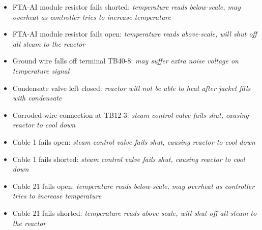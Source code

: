 





\begin{itemize}
\item{} FTA-AI module resistor fails shorted: {\it temperature reads below-scale, may overheat as controller tries to increase temperature}
\item{} FTA-AI module resistor fails open: {\it temperature reads above-scale, will shut off all steam to the reactor}
\item{} Ground wire falls off terminal TB40-8: {\it may suffer extra noise voltage on temperature signal}
\item{} Condensate valve left closed: {\it reactor will not be able to heat after jacket fills with condensate}
\item{} Corroded wire connection at TB12-3: {\it steam control valve fails shut, causing reactor to cool down}
\item{} Cable 1 fails open: {\it steam control valve fails shut, causing reactor to cool down}
\item{} Cable 1 fails shorted: {\it steam control valve fails shut, causing reactor to cool down}
\item{} Cable 21 fails open: {\it temperature reads below-scale, may overheat as controller tries to increase temperature}
\item{} Cable 21 fails shorted: {\it temperature reads above-scale, will shut off all steam to the reactor}
\end{itemize}












